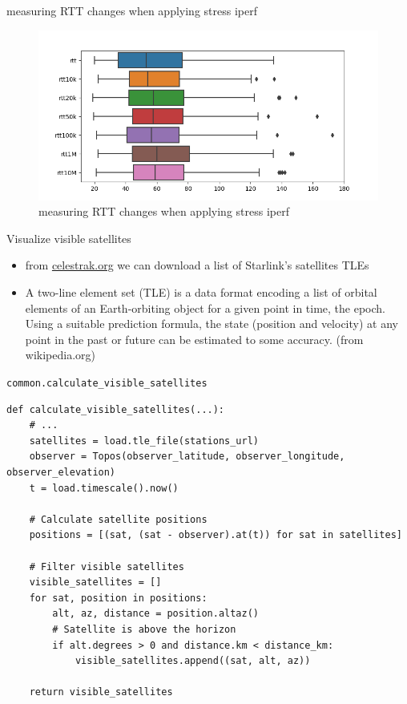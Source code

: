 \documentclass[NET,english,beameralt]{tumbeamer}
\begin{document}
\begin{frame}{measuring RTT changes when applying stress iperf}
    \begin{figure}
        \includegraphics[width=1\textwidth]{pics/rtt-iperf-stress.png}
        \caption[short]{measuring RTT changes when applying stress iperf}
    \end{figure}
\end{frame}

\begin{frame}{Visualize visible satellites}
    \begin{itemize}
        \item from \href{celestrak.org}{celestrak.org} we can download a list of Starlink's satellites TLEs
        \item A two-line element set (TLE) is a data format encoding a list of orbital elements of an Earth-orbiting object for a given point in time, the epoch. Using a suitable prediction formula, the state (position and velocity) at any point in the past or future can be estimated to some accuracy. (from wikipedia.org)
    \end{itemize}
\end{frame}

\begin{frame}[fragile]{\texttt{common.calculate\_visible\_satellites}}
    \begin{verbatim}
def calculate_visible_satellites(...):
    # ...
    satellites = load.tle_file(stations_url)
    observer = Topos(observer_latitude, observer_longitude, observer_elevation)
    t = load.timescale().now()

    # Calculate satellite positions
    positions = [(sat, (sat - observer).at(t)) for sat in satellites]
    
    # Filter visible satellites
    visible_satellites = []
    for sat, position in positions:
        alt, az, distance = position.altaz()
        # Satellite is above the horizon
        if alt.degrees > 0 and distance.km < distance_km:
            visible_satellites.append((sat, alt, az))

    return visible_satellites
    \end{verbatim}
\end{frame}
\end{document}
